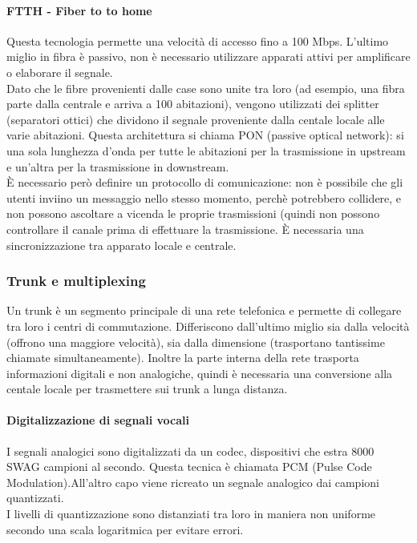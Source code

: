 \documentclass{article}
\begin{document}
		\paragraph{FTTH - Fiber to to home} Questa tecnologia permette una velocità di accesso fino a 100 Mbps. L'ultimo miglio in fibra è passivo, non è necessario utilizzare apparati attivi per amplificare o elaborare il segnale. \\
			Dato che le fibre provenienti dalle case sono unite tra loro (ad esempio, una fibra parte dalla centrale e arriva a 100 abitazioni), vengono utilizzati dei splitter (separatori ottici) che dividono il segnale proveniente dalla centale locale alle varie abitazioni. Questa architettura si chiama PON (passive optical network): si una sola lunghezza d'onda per tutte le abitazioni per la trasmissione in upstream e un'altra per la trasmissione in downstream.\\
			È necessario però definire un protocollo di comunicazione: non è possibile che gli utenti inviino un messaggio nello stesso momento, perchè potrebbero collidere, e non possono ascoltare a vicenda le proprie trasmissioni (quindi non possono controllare il canale prima di effettuare la trasmissione. È necessaria una sincronizzazione tra apparato locale e centrale.
			\subsubsection{Trunk e multiplexing} 
			Un trunk è un segmento principale di una rete telefonica e permette di collegare tra loro i centri di commutazione. Differiscono dall'ultimo miglio sia dalla velocità (offrono una maggiore velocità), sia dalla dimensione (trasportano tantissime chiamate simultaneamente). Inoltre la parte interna della rete trasporta informazioni digitali e non analogiche, quindi è necessaria una conversione alla centale locale per trasmettere sui trunk a lunga distanza. \\
			\paragraph{Digitalizzazione di segnali vocali} I segnali analogici sono digitalizzati da un codec, dispositivi che estra 8000 SWAG campioni al secondo. Questa tecnica è chiamata PCM (Pulse Code Modulation).All'altro capo viene ricreato un segnale analogico dai campioni quantizzati. \\
			I livelli di quantizzazione sono distanziati tra loro in maniera non uniforme secondo una scala logaritmica per evitare errori.
\end{document}
